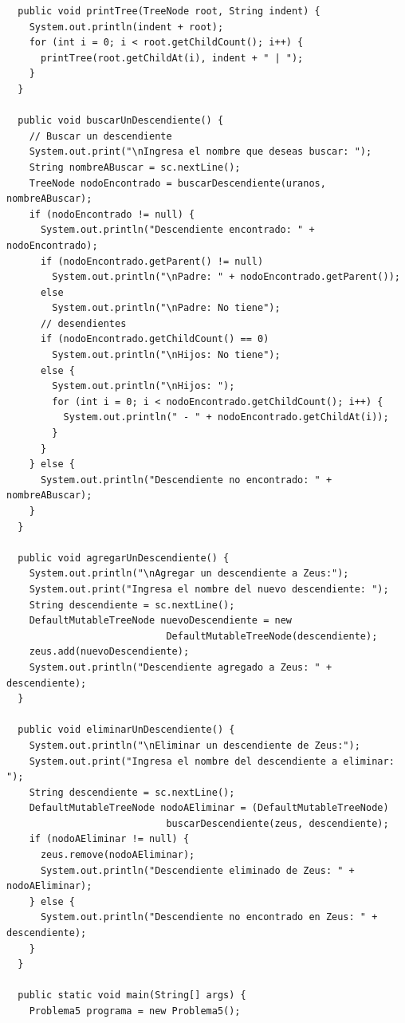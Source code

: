 \documentclass[11pt, twocolumn]{article}
\begin{document}
\begin{lstlisting}
  public void printTree(TreeNode root, String indent) {
    System.out.println(indent + root);
    for (int i = 0; i < root.getChildCount(); i++) {
      printTree(root.getChildAt(i), indent + " | ");
    }
  }

  public void buscarUnDescendiente() {
    // Buscar un descendiente
    System.out.print("\nIngresa el nombre que deseas buscar: ");
    String nombreABuscar = sc.nextLine();
    TreeNode nodoEncontrado = buscarDescendiente(uranos, nombreABuscar);
    if (nodoEncontrado != null) {
      System.out.println("Descendiente encontrado: " + nodoEncontrado);
      if (nodoEncontrado.getParent() != null)
        System.out.println("\nPadre: " + nodoEncontrado.getParent());
      else
        System.out.println("\nPadre: No tiene");
      // desendientes
      if (nodoEncontrado.getChildCount() == 0)
        System.out.println("\nHijos: No tiene");
      else {
        System.out.println("\nHijos: ");
        for (int i = 0; i < nodoEncontrado.getChildCount(); i++) {
          System.out.println(" - " + nodoEncontrado.getChildAt(i));
        }
      }
    } else {
      System.out.println("Descendiente no encontrado: " + nombreABuscar);
    }
  }

  public void agregarUnDescendiente() {
    System.out.println("\nAgregar un descendiente a Zeus:");
    System.out.print("Ingresa el nombre del nuevo descendiente: ");
    String descendiente = sc.nextLine();
    DefaultMutableTreeNode nuevoDescendiente = new 
                            DefaultMutableTreeNode(descendiente);
    zeus.add(nuevoDescendiente);
    System.out.println("Descendiente agregado a Zeus: " + descendiente);
  }

  public void eliminarUnDescendiente() {
    System.out.println("\nEliminar un descendiente de Zeus:");
    System.out.print("Ingresa el nombre del descendiente a eliminar: ");
    String descendiente = sc.nextLine();
    DefaultMutableTreeNode nodoAEliminar = (DefaultMutableTreeNode) 
                            buscarDescendiente(zeus, descendiente);
    if (nodoAEliminar != null) {
      zeus.remove(nodoAEliminar);
      System.out.println("Descendiente eliminado de Zeus: " + nodoAEliminar);
    } else {
      System.out.println("Descendiente no encontrado en Zeus: " + descendiente);
    }
  }

  public static void main(String[] args) {
    Problema5 programa = new Problema5();


\end{lstlisting}
\end{document}
